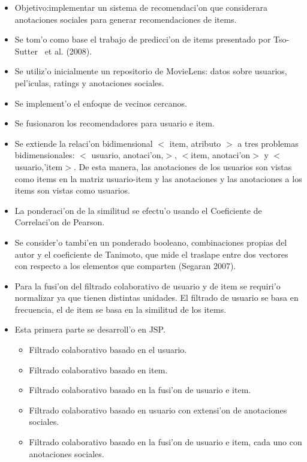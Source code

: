 \documentclass[11pt]{article}
\begin{document}
\begin{itemize}
\item Objetivo:implementar un sistema de recomendaci'on que considerara anotaciones sociales para generar recomendaciones de items.
\item Se tom'o como base el trabajo de predicci'on de items presentado por Tso-Sutter~\cite{tagaware:tso} et al. (2008).
\item Se utiliz'o inicialmente un repositorio de MovieLens: datos sobre usuarios, pel'iculas, ratings y anotaciones sociales.
\item Se implement'o el enfoque de vecinos cercanos.
\item Se fusionaron los recomendadores para usuario e item.
\item Se extiende la relaci'on bidimensional $<$ item, atributo $>$ a tres problemas bidimensionales: $<$ usuario, anotaci'on,$>$, $<$item, anotaci'on$>$ y $<$usuario,'item$>$. De esta manera, las anotaciones de los usuarios son vistas como items en la matriz usuario-item y las anotaciones y las anotaciones a los items son vistas como usuarios.
\item La ponderaci'on de la similitud se efectu'o usando el Coeficiente de Correlaci'on de Pearson.
\item Se consider'o tambi'en un ponderado booleano, combinaciones propias del autor y el coeficiente de Tanimoto, que mide el traslape entre dos vectores con respecto a los elementos que comparten (Segaran 2007).
\item Para la fusi'on del filtrado colaborativo de usuario y de item se requiri'o normalizar ya que tienen distintas unidades. El filtrado de usuario se basa en frecuencia, el de item se basa en la similitud de los items.
\item Esta primera parte se desarroll'o en JSP.
	\begin{itemize}
		\item Filtrado colaborativo basado en el usuario.
		\item Filtrado colaborativo basado en item.
		\item Filtrado colaborativo basado en la fusi'on de usuario e item.
		\item Filtrado colaborativo basado en usuario con extensi'on de anotaciones sociales.
		\item Filtrado colaborativo basado en la fusi'on de usuario e item, cada uno con anotaciones sociales.
	\end{itemize}
\end{itemize}
\end{document}
